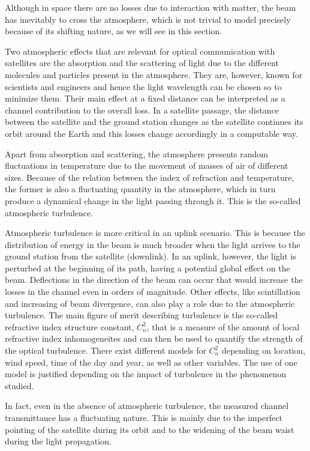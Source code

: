\documentclass[%
 reprint,
 amsmath,amssymb,
 aps,
]{revtex4-1}
\begin{document}
Although in space there are no losses due to interaction with matter, the beam has inevitably to cross the atmosphere, which is not trivial to model precisely because of its shifting nature, as we will see in this section.

Two atmospheric effects that are relevant for optical communication with satellites are the absorption and the scattering of light due to the different molecules and particles present in the atmosphere. They are, however, known for scientists and engineers and hence the light wavelength can be chosen so to minimize them. Their main effect at a fixed distance can be interpreted as a channel contribution to the overall loss. In a satellite passage, the distance between the satellite and the ground station changes as the satellite continues its orbit around the Earth and this losses change accordingly in a computable way.

Apart from absorption and scattering, the atmosphere presents random fluctuations in temperature due to the movement of masses of air of different sizes. Because of the relation between the index of refraction and temperature, the former is also a fluctuating quantity in the atmosphere, which in turn produce a dynamical change in the light passing through it. This is the so-called atmospheric turbulence.

Atmospheric turbulence is more critical in an uplink scenario. This is because the distribution of energy in the beam is much broader when the light arrives to the ground station from the satellite (downlink). In an uplink, however, the light is perturbed at the beginning of its path, having a potential global effect on the beam. Deflections in the direction of the beam can occur that would increase the losses in the channel even in orders of magnitude. Other effects, like scintillation and increasing of beam divergence, can also play a role due to the atmospheric turbulence. The main figure of merit describing turbulence is the so-called refractive index structure constant, $C_n^2$, that is a measure of the amount of local refractive index inhomogeneites and can then be used to quantify the strength of the optical turbulence. There exist different models for $C_n^2$ depending on location, wind speed, time of the day and year, as well as other variables. The use of one model is justified depending on the impact of turbulence in the phenomenon studied.

In fact, even in the absence of atmospheric turbulence, the measured channel transmittance has a fluctuating nature. This is mainly due to the imperfect pointing of the satellite during its orbit and to the widening of the beam waist during the light propagation.
\end{document}

